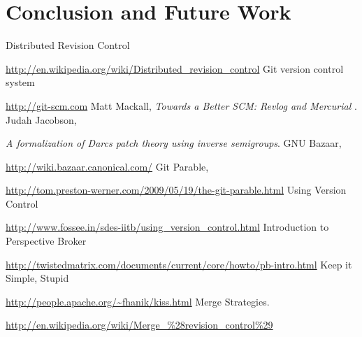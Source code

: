 \documentclass[12pt]{article}
\begin{document}
\section{Conclusion and Future Work}
\begin{thebibliography}{99}
Distributed Revision Control

\url{http://en.wikipedia.org/wiki/Distributed_revision_control}
Git version control system

\url{http://git-scm.com}
Matt Mackall, \emph{Towards a Better SCM: Revlog and Mercurial} .
Judah Jacobson,

\emph{A formalization of Darcs patch theory using inverse
  semigroups}.
GNU Bazaar,

\url{http://wiki.bazaar.canonical.com/}
Git Parable,

\url{http://tom.preston-werner.com/2009/05/19/the-git-parable.html}
Using Version Control

\url{http://www.fossee.in/sdes-iitb/using_version_control.html}
Introduction to Perspective Broker

\url{http://twistedmatrix.com/documents/current/core/howto/pb-intro.html}
Keep it Simple, Stupid

\url{http://people.apache.org/~fhanik/kiss.html}
Merge Strategies.

\url{http://en.wikipedia.org/wiki/Merge_%28revision_control%29}
\end{thebibliography}
\end{document}
